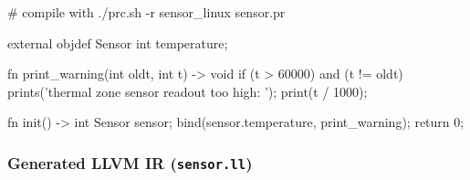 \begin{mylisting}
# compile with ./prc.sh -r sensor_linux sensor.pr

external objdef Sensor
{
  int temperature;
}

fn print_warning(int oldt, int t) -> void
{
  if (t > 60000) and (t != oldt)
  {
    prints('thermal zone sensor readout too high: ');
    print(t / 1000);
  }
}

fn init() -> int
{
  Sensor sensor;
  bind(sensor.temperature, print_warning);
  return 0;
}
\end{mylisting}

\subsubsection{Generated LLVM IR (\texttt{sensor.ll})}

